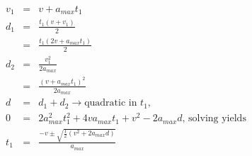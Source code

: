 \begin{eqnarray*}
v_1 & = & v + a_{max} t_1 \\
d_1 & = & \frac{t_1 (v + v_1)}{2} \\
& = & \frac{t_1 (2 v + a_{max} t_1)}{2} \\
d_2 & = & \frac{v_1^2}{2 a_{max}} \\
& = & \frac{(v + a_{max} t_1)^2}{2 a_{max}} \\
d & = & d_1 + d_2 \to \textrm{quadratic in } t_1, \\
0 & = & 2 a_{max}^2 t_1^2 + 4 v a_{max} t_1 + v^2 - 2 a_{max} d
\textrm{, solving yields}\\
t_1 & = & \frac{-v \pm \sqrt{\frac{1}{2} (v^2 + 2 a_{max} d)}}{a_{max}}
\end{eqnarray*}
